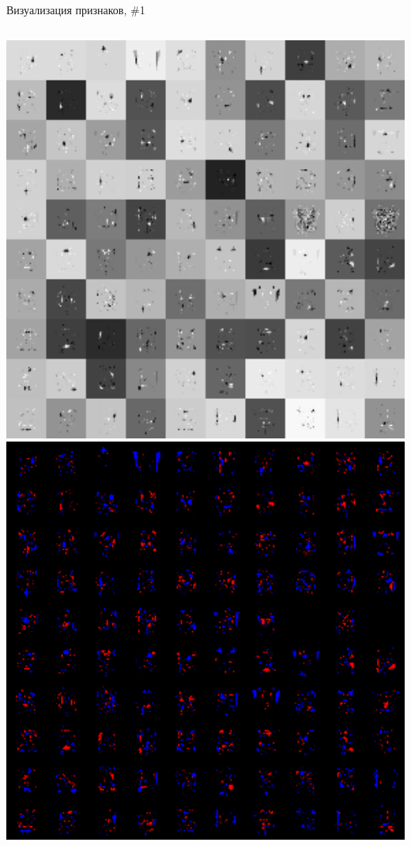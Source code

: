 \documentclass[10pt]{beamer}
\begin{document}
\begin{frame}{Визуализация признаков, \#1}
\begin{columns}
    \includegraphics[width=1\textwidth]{images/feats1.png}
	\includegraphics[width=1\textwidth]{images/feats2.png}
\end{columns}

\end{frame}
\end{document}
